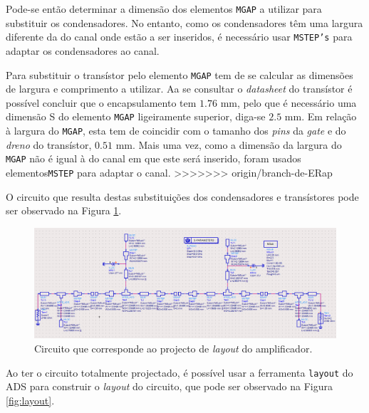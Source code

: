 \documentclass[11pt]{article}
\numberwithin{equation}{section}
\begin{document}
\vspace{1mm}
Pode-se então determinar a dimensão dos elementos \texttt{MGAP} a utilizar para substituir os condensadores. No entanto, como os condensadores têm uma largura diferente da do canal onde estão a ser inseridos, é necessário usar \texttt{MSTEP's} para adaptar os condensadores ao canal.

Para substituir o transístor pelo elemento \texttt{MGAP} tem de se calcular as dimensões de largura e comprimento a utilizar. Aa se consultar o \textit{datasheet} do transístor é possível concluir que o encapsulamento tem $1.76$ mm, pelo que é necessário uma dimensão S do elemento \texttt{MGAP} ligeiramente superior, diga-se $2.5$ mm. Em relação à largura do \texttt{MGAP}, esta tem de coincidir com o tamanho dos \textit{pins} da \textit{gate} e do \textit{dreno} do transístor, $0.51$ mm. Mais uma vez, como a dimensão da largura do \texttt{MGAP} não é igual à do canal em que este será inserido, foram usados elementos\texttt{MSTEP} para adaptar o canal.
>>>>>>> origin/branch-de-ERap

O circuito que resulta destas substituições dos condensadores e transístores pode ser observado na Figura \ref{fig:Circuito_layout}.

\begin{figure}[H]
	\centering
	\includegraphics[keepaspectratio=true, scale=0.45]{exps/Circuito_layout}
	\vspace{-0.5em}
	\caption{Circuito que corresponde ao projecto de \textit{layout} do amplificador.}
	\vspace{-0.8em}
	\label{fig:Circuito_layout}
\end{figure}

Ao ter o circuito totalmente projectado, é possível usar a ferramenta \texttt{layout} do ADS para construir o \textit{layout} do circuito, que pode ser observado na Figura \ref{fig:layout}.
\end{document}
